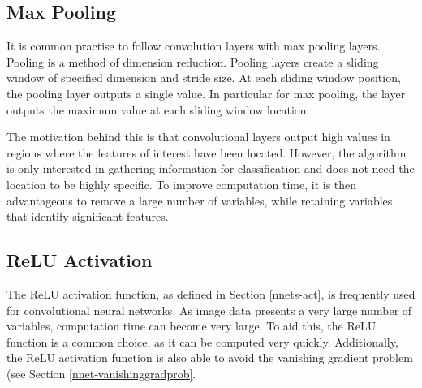 \subsection{Max Pooling}\label{convnets-pool}

It is common practise to follow convolution layers with max pooling layers. Pooling is a method of dimension reduction. Pooling layers create a sliding window of specified dimension and stride size. At each sliding window position, the pooling layer outputs a single value. In particular for max pooling, the layer outputs the maximum value at each sliding window location.

The motivation behind this is that convolutional layers output high values in regions where the features of interest have been located. However, the algorithm is only interested in gathering information for classification and does not need the location to be highly specific. To improve computation time, it is then advantageous to remove a large number of variables, while retaining variables that identify significant features.

\subsection{ReLU Activation}\label{convnets-act}

The ReLU activation function, as defined in Section \ref{nnets-act}, is frequently used for  convolutional neural networks. As image data presents a very large number of variables, computation time can become very large. To aid this, the ReLU function is a common choice, as it can be computed very quickly. Additionally, the ReLU activation function is also able to avoid the vanishing gradient problem (see Section \ref{nnet-vanishinggradprob}.


%
%

